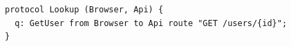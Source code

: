 \begin{lstlisting}[language={},basicstyle=\ttfamily\footnotesize,breaklines=true]
protocol Lookup (Browser, Api) {
  q: GetUser from Browser to Api route "GET /users/{id}";
}
\end{lstlisting}
